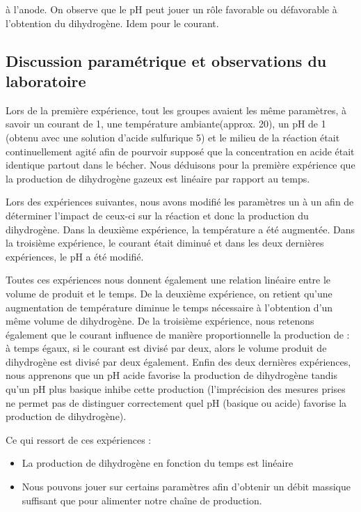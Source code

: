 à l'anode. On observe que le pH peut jouer un rôle favorable ou
défavorable à l'obtention du dihydrogène. Idem pour le courant.

\subsection{Discussion paramétrique et observations du laboratoire}
Lors de la première expérience, tout les groupes avaient les même paramètres,
à savoir un courant de \unit{1}{\ampere}, une température ambiante(approx. \unit{20}{\celsius}),
un pH de 1 (obtenu avec une solution d'acide sulfurique \unit{5}{\mole\per\liter}) et le milieu de
la réaction était continuellement agité afin de pourvoir supposé que la
concentration en acide était identique partout dans le bécher. Nous déduisons
pour la première expérience que la production de dihydrogène gazeux est linéaire
par rapport au temps.

Lors des expériences suivantes, nous avons modifié les paramètres un à
un afin de déterminer l'impact de ceux-ci sur la réaction et donc la
production du dihydrogène. Dans la deuxième expérience, la température
a été augmentée. Dans la troisième expérience, le courant était diminué
et dans les deux dernières expériences, le pH a été modifié.

Toutes ces expériences nous donnent également une relation linéaire
entre le volume de  produit et le temps. De la deuxième expérience,
on retient qu'une augmentation de température diminue le temps nécessaire
à l'obtention d'un même volume de dihydrogène. De la troisième expérience,
nous retenons également que le courant influence de manière proportionnelle
la production de  : à temps égaux, si le courant est divisé par deux,
alors le volume produit de dihydrogène est divisé par deux également. Enfin
des deux dernières expériences, nous apprenons que un pH acide favorise la
production de dihydrogène tandis qu'un pH plus basique inhibe cette
production (l'imprécision des mesures prises ne permet pas de distinguer
correctement quel pH (basique ou acide) favorise la production de dihydrogène).

Ce qui ressort de ces expériences :

\begin{itemize}
	\item La production de dihydrogène en fonction du temps est linéaire
	\item Nous pouvons jouer sur certains paramètres afin d'obtenir un débit
	massique suffisant que pour alimenter notre chaîne de production.
\end{itemize}

